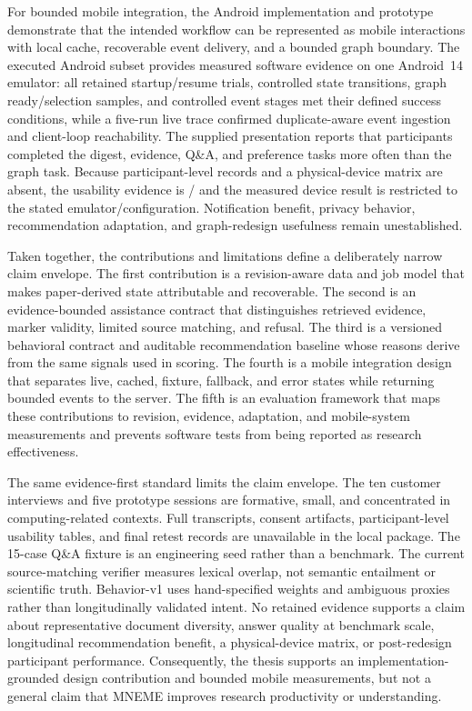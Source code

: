 For bounded mobile integration, the Android implementation and prototype demonstrate that the intended workflow can be represented as mobile interactions with local cache, recoverable event delivery, and a bounded graph boundary.
The executed Android subset provides measured software evidence on one Android~14 emulator: all retained startup/resume trials, controlled state transitions, graph ready/selection samples, and controlled event stages met their defined success conditions, while a five-run live trace confirmed duplicate-aware event ingestion and client-loop reachability.
The supplied presentation reports that participants completed the digest, evidence, Q\&A, and preference tasks more often than the graph task.
Because participant-level records and a physical-device matrix are absent, the usability evidence is \observed{}/\limited{} and the measured device result is restricted to the stated emulator/configuration.
Notification benefit, privacy behavior, recommendation adaptation, and graph-redesign usefulness remain unestablished.

Taken together, the contributions and limitations define a deliberately narrow claim envelope.
The first contribution is a revision-aware data and job model that makes paper-derived state attributable and recoverable.
The second is an evidence-bounded assistance contract that distinguishes retrieved evidence, marker validity, limited source matching, and refusal.
The third is a versioned behavioral contract and auditable recommendation baseline whose reasons derive from the same signals used in scoring.
The fourth is a mobile integration design that separates live, cached, fixture, fallback, and error states while returning bounded events to the server.
The fifth is an evaluation framework that maps these contributions to revision, evidence, adaptation, and mobile-system measurements and prevents software tests from being reported as research effectiveness.

The same evidence-first standard limits the claim envelope.
The ten customer interviews and five prototype sessions are formative, small, and concentrated in computing-related contexts.
Full transcripts, consent artifacts, participant-level usability tables, and final retest records are unavailable in the local package.
The 15-case Q\&A fixture is an engineering seed rather than a benchmark.
The current source-matching verifier measures lexical overlap, not semantic entailment or scientific truth.
Behavior-v1 uses hand-specified weights and ambiguous proxies rather than longitudinally validated intent.
No retained evidence supports a claim about representative document diversity, answer quality at benchmark scale, longitudinal recommendation benefit, a physical-device matrix, or post-redesign participant performance.
Consequently, the thesis supports an implementation-grounded design contribution and bounded mobile measurements, but not a general claim that MNEME improves research productivity or understanding.

